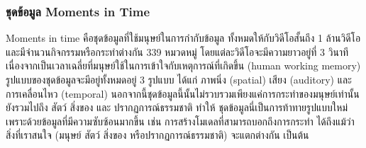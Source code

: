 \subsubsection*{ชุดข้อมูล Moments in Time}
	Moments in time\textsuperscript{\cite{monfort2019moments}} คือชุดข้อมูลที่ใช้มนุษย์ในการกำกับข้อมูล ทั้งหมดให้กับวิดีโอสั้นถึง 1 ล้านวิดีโอ และมีจำนวนกิจกรรมหรือกระทำต่างกัน 339 หมวดหมู่ โดยแต่ละวิดีโอจะมีความยาวอยู่ที่ 3 วินาที เนื่องจากเป็นเวลาเฉลี่ยที่มนุษย์ใช้ในการเข้าใจกับเหตุการณ์ที่เกิดขึ้น (human working memory) รูปแบบของชุดข้อมูลจะมีอยู่ทั้งหมดอยู่ 3 รูปแบบ ได้แก่ ภาพนิ่ง (spatial) เสียง (auditory) และการเคลื่อนไหว (temporal) นอกจากนี้ชุดข้อมูลนี้นั้นไม่รวบรวมเพียงแค่การกระทำของมนุษย์เท่านั้น ยังรวมไปถึง สัตว์ สิ่งของ และ ปรากฏการณ์ธรรมชาติ ทำให้ ชุดข้อมูลนี่เป็นการท้าทายรูปแบบใหม่เพราะด้วยข้อมูลที่มีความซับซ้อนมากขึ้น เช่น การสร้างโมเดลที่สามารถบอกถึงการกระทำ ได้ถึงแม้ว่าสิ่งที่เราสนใจ (มนุษย์ สัตว์ สิ่งของ หรือปรากฏการณ์ธรรมชาติ) จะแตกต่างกัน เป็นต้น
